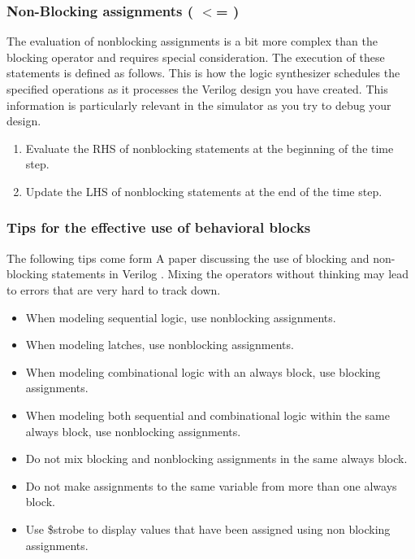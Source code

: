     \subsubsection{Non-Blocking assignments \bfseries ( $<$= )} 
      The evaluation of nonblocking assignments is a bit more complex than the blocking operator and requires special consideration. The execution of these statements is defined as follows. This is how the logic synthesizer schedules the specified operations as it processes the Verilog design you have created. This information is particularly relevant in the simulator as you try to debug your design. 
      \begin{enumerate}
        \item Evaluate the RHS of nonblocking statements at the beginning of the time step.
        \item Update the LHS of nonblocking statements at the end of the time step.
      \end{enumerate}
      \cite{Sunburst:BlockNoBlock}

    \subsubsection{Tips for the effective use of behavioral blocks}
      The following tips come form A paper discussing the use of blocking and non-blocking statements in Verilog . Mixing the operators without thinking may lead to errors that are very hard to track down.
      \begin{itemize}
        \item When modeling sequential logic, use nonblocking assignments.
        \item When modeling latches, use nonblocking assignments.
        \item When modeling combinational logic with an always block, use blocking assignments.
        \item When modeling both sequential and combinational logic within the same always block, use nonblocking assignments.
        \item Do not mix blocking and nonblocking assignments in the same always block.
        \item Do not make assignments to the same variable from more than one always block.
        \item Use \$strobe to display values that have been assigned using non blocking assignments.
      \end{itemize}

